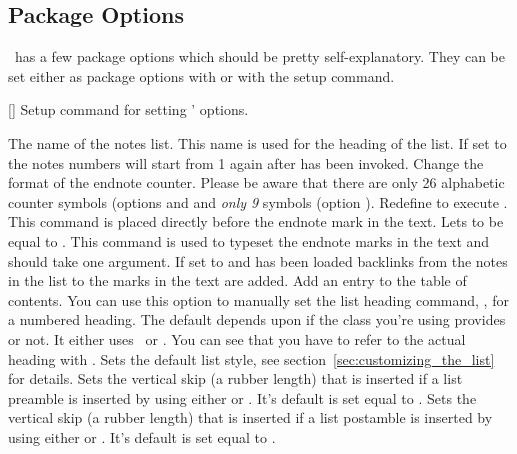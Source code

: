 \documentclass[load-preamble+]{cnltx-doc}
\begin{document}
\subsection{Package Options}
\enotez\ has a few package options which should be pretty self-explanatory.
They can be set either as package options with
 or with the setup command.
\begin{commands}
  []
    Setup command for setting \enotez' options.
\end{commands}
\begin{options}
    The name of the notes list. This name is used for the heading of the
    list.
    If set to  the notes numbers will start from 1 again after
     has been invoked.
    Change the format of the endnote counter.  Please be aware that there are
    only 26 alphabetic counter symbols (options  and 
    and \emph{only 9} symbols (option ).
  \Default
    Redefine  to execute .  This command is placed
    directly before the endnote mark in the text.
    Lets  to be equal to .  This command
    is used to typeset the endnote marks in the text and should take one
    argument.
  \label{key:backref}
    If set to  and  has been
    loaded backlinks from the notes in the list to the marks in the text are
    added.
  \label{key:totoc}
    Add an entry to the table of contents.
    You can use this option to manually set the list heading command, \eg,
     for a numbered heading.  The
    default depends upon if the class you're using provides  or
    not.  It either uses \sarg\ or \sarg. You can
    see that you have to refer to the actual heading with .
    Sets the default list style, see section~\ref{sec:customizing_the_list}
    for details.
    Sets the vertical skip (a rubber length) that is
    inserted if a list preamble is inserted by using either
     or .  It's default is set
    equal to .
    Sets the vertical skip (a rubber length) that is
    inserted if a list postamble is inserted by using either
     or .  It's default
    is set equal to .
\end{options}
\end{document}
